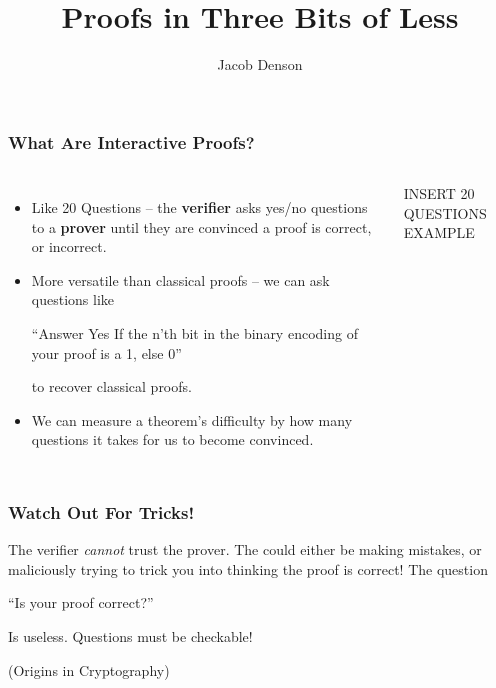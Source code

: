 \documentclass{beamer}
\title{Proofs in Three Bits of Less}
\author{Jacob Denson}
\institute{University of British Columbia}
\begin{document}
\maketitle

\begin{frame}
    \frametitle{What Are Interactive Proofs?}

    \begin{columns}

    \begin{itemize}
        \item Like 20 Questions -- the {\bf verifier} asks yes/no questions to a {\bf prover} until they are convinced a proof is correct, or incorrect.

        \item More versatile than classical proofs -- we can ask questions like
        \begin{center} ``Answer Yes If the n'th bit in the binary encoding of your proof is a 1, else 0''
        \end{center}
        to recover classical proofs.

        \item We can measure a theorem's difficulty by how many questions it takes for us to become convinced.
    \end{itemize}

    INSERT 20 QUESTIONS EXAMPLE

    \end{columns}
\end{frame}

\begin{frame}
    \frametitle{Watch Out For Tricks!}

    The verifier {\it cannot} trust the prover. The could either be making mistakes, or maliciously trying to trick you into thinking the proof is correct! The question
    \begin{center} ``Is your proof correct?'' \end{center}
    Is useless. Questions must be checkable!

    (Origins in Cryptography)
\end{frame}
\end{document}
